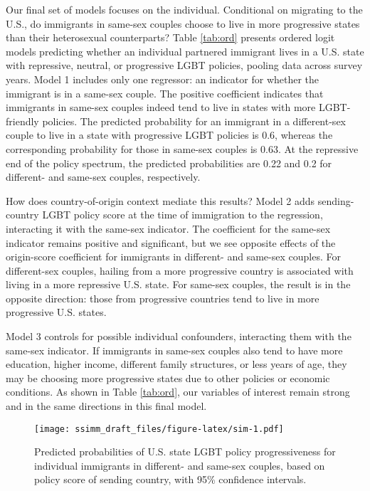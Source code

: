 \documentclass[
  11pt,
]{article}
\begin{document}
Our final set of models focuses on the individual. Conditional on migrating to the U.S., do immigrants in same-sex couples choose to live in more progressive states than their heterosexual counterparts? Table \ref{tab:ord} presents ordered logit models predicting whether an individual partnered immigrant lives in a U.S. state with repressive, neutral, or progressive LGBT policies, pooling data across survey years. Model 1 includes only one regressor: an indicator for whether the immigrant is in a same-sex couple. The positive coefficient indicates that immigrants in same-sex couples indeed tend to live in states with more LGBT-friendly policies. The predicted probability for an immigrant in a different-sex couple to live in a state with progressive LGBT policies is 0.6, whereas the corresponding probability for those in same-sex couples is 0.63. At the repressive end of the policy spectrum, the predicted probabilities are 0.22 and 0.2 for different- and same-sex couples, respectively.

How does country-of-origin context mediate this results? Model 2 adds sending-country LGBT policy score at the time of immigration to the regression, interacting it with the same-sex indicator. The coefficient for the same-sex indicator remains positive and significant, but we see opposite effects of the origin-score coefficient for immigrants in different- and same-sex couples. For different-sex couples, hailing from a more progressive country is associated with living in a more repressive U.S. state. For same-sex couples, the result is in the opposite direction: those from progressive countries tend to live in more progressive U.S. states.

Model 3 controls for possible individual confounders, interacting them with the same-sex indicator. If immigrants in same-sex couples also tend to have more education, higher income, different family structures, or less years of age, they may be choosing more progressive states due to other policies or economic conditions. As shown in Table \ref{tab:ord}, our variables of interest remain strong and in the same directions in this final model.

\begin{figure}
\centering
\texttt{[image: ssimm\_draft\_files/figure-latex/sim-1.pdf]}
\caption{\label{fig:sim}Predicted probabilities of U.S. state LGBT policy progressiveness for individual immigrants in different- and same-sex couples, based on policy score of sending country, with 95\% confidence intervals.}
\end{figure}
\end{document}
